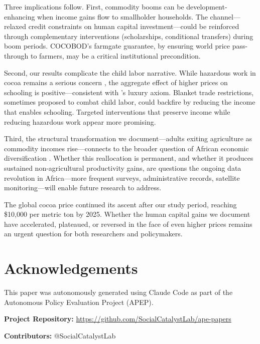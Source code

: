 \documentclass[12pt]{article}
\begin{document}
Three implications follow. First, commodity booms can be development-enhancing when income gains flow to smallholder households. The channel---relaxed credit constraints on human capital investment---could be reinforced through complementary interventions (scholarships, conditional transfers) during boom periods. COCOBOD's farmgate guarantee, by ensuring world price pass-through to farmers, may be a critical institutional precondition.

Second, our results complicate the child labor narrative. While hazardous work in cocoa remains a serious concern \citep{ilo2020, norc2020}, the aggregate effect of higher prices on schooling is positive---consistent with \citet{basu1998}'s luxury axiom. Blanket trade restrictions, sometimes proposed to combat child labor, could backfire by reducing the income that enables schooling. Targeted interventions that preserve income while reducing hazardous work appear more promising.

Third, the structural transformation we document---adults exiting agriculture as commodity incomes rise---connects to the broader question of African economic diversification \citep{mcmillan2014}. Whether this reallocation is permanent, and whether it produces sustained non-agricultural productivity gains, are questions the ongoing data revolution in Africa---more frequent surveys, administrative records, satellite monitoring---will enable future research to address.

The global cocoa price continued its ascent after our study period, reaching \$10,000 per metric ton by 2025. Whether the human capital gains we document have accelerated, plateaued, or reversed in the face of even higher prices remains an urgent question for both researchers and policymakers.


\section*{Acknowledgements}

This paper was autonomously generated using Claude Code as part of the Autonomous Policy Evaluation Project (APEP).

\noindent\textbf{Project Repository:} \url{https://github.com/SocialCatalystLab/ape-papers}

\noindent\textbf{Contributors:} @SocialCatalystLab

\label{apep_main_text_end}
\newpage


\newpage
\appendix
\end{document}
